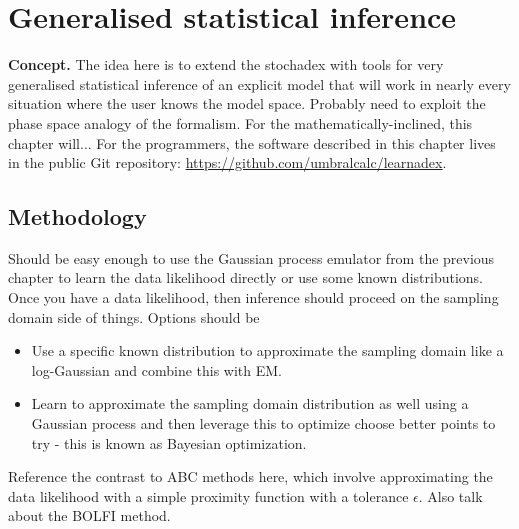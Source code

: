 \chapter{\sffamily Generalised statistical inference}

{\bfseries\sffamily Concept.} The idea here is to extend the stochadex with tools for very generalised statistical inference of an explicit model that will work in nearly every situation where the user knows the model space. Probably need to exploit the phase space analogy of the formalism. For the mathematically-inclined, this chapter will... For the programmers, the software described in this chapter lives in the public Git repository: \href{https://github.com/umbralcalc/learnadex}{https://github.com/umbralcalc/learnadex}.


\section{\sffamily Methodology}

Should be easy enough to use the Gaussian process emulator from the previous chapter to learn the data likelihood directly or use some known distributions. Once you have a data likelihood, then inference should proceed on the sampling domain side of things. Options should be
\begin{itemize}
\item{Use a specific known distribution to approximate the sampling domain like a log-Gaussian and combine this with EM.}
\item{Learn to approximate the sampling domain distribution as well using a Gaussian process and then leverage this to optimize choose better points to try - this is known as Bayesian optimization.} 
\end{itemize}

Reference the contrast to ABC methods here, which involve approximating the data likelihood with a simple proximity function with a tolerance $\epsilon$. Also talk about the BOLFI method.